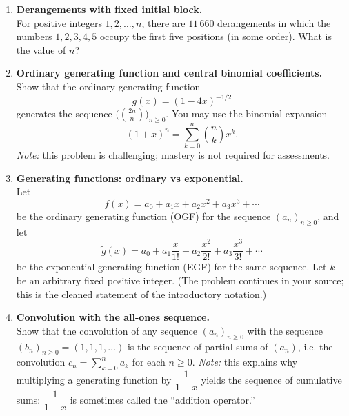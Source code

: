\documentclass{article}
\theoremstyle{definition}
\begin{document}
\begin{enumerate}
\newpage



\item \textbf{Derangements with fixed initial block.} \\
For positive integers $1,2,\dots,n$, there are $11\,660$ derangements 
in which the numbers $1,2,3,4,5$ occupy the first five positions 
(in some order). What is the value of $n$?



\item \textbf{Ordinary generating function and central binomial coefficients.} \\
Show that the ordinary generating function
\[
g(x) = (1-4x)^{-1/2}
\]
generates the sequence $\bigl(\binom{2n}{n}\bigr)_{n\ge0}$. You may use 
the binomial expansion
\[
(1+x)^n=\sum_{k=0}^n \binom{n}{k} x^k.
\]
\emph{Note:} this problem is challenging; mastery is not required 
for assessments.

\item \textbf{Generating functions: ordinary vs exponential.} \\
Let
\[
f(x)=a_0+a_1 x+a_2 x^2+a_3 x^3+\cdots
\]
be the ordinary generating function (OGF) for the sequence $(a_n)_{n\ge0}$, and let
\[
\tilde g(x)=a_0 + a_1\frac{x}{1!} + a_2\frac{x^2}{2!} + a_3\frac{x^3}{3!} + \cdots
\]
be the exponential generating function (EGF) for the same sequence. Let $k$ be an arbitrary fixed positive integer. (The problem continues in your source; this is the cleaned statement of the introductory notation.)

\medskip

\item \textbf{Convolution with the all-ones sequence.} \\
Show that the convolution of any sequence $(a_n)_{n\ge0}$ with 
the sequence $(b_n)_{n\ge0}=(1,1,1,\dots)$ is the sequence of 
partial sums of $(a_n)$, i.e. the convolution $c_n=\sum_{k=0}^n a_k$ 
for each $n\ge0$.  
\newline
\emph{Note:} this explains why multiplying a generating function by 
$\dfrac{1}{1-x}$ yields the sequence of cumulative sums: $\dfrac{1}{1-x}$ 
is sometimes called the ``addition operator.''

\end{enumerate}
\end{document}
